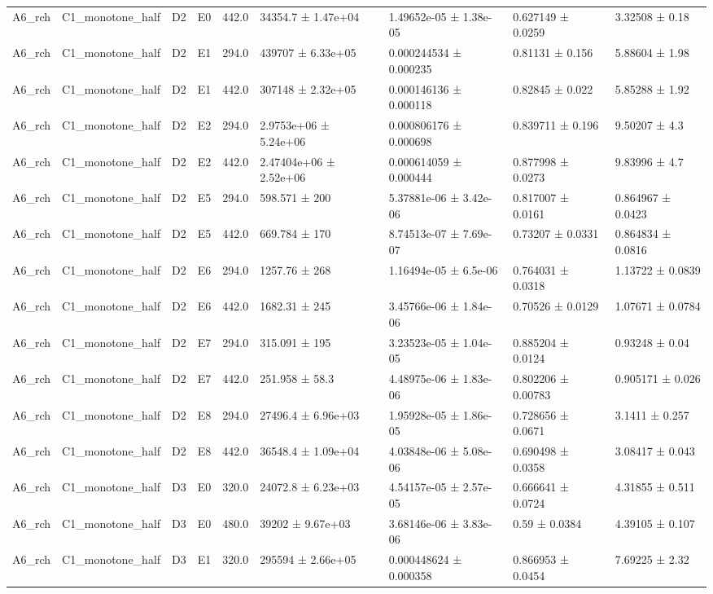 \begin{table}
\begin{tabular}{lllllllll}
A6\_rch & C1\_monotone\_half & D2 & E0 & 442.0 & 34354.7 ± 1.47e+04 & 1.49652e-05 ± 1.38e-05 & 0.627149 ± 0.0259 & 3.32508 ± 0.18 \\
A6\_rch & C1\_monotone\_half & D2 & E1 & 294.0 & 439707 ± 6.33e+05 & 0.000244534 ± 0.000235 & 0.81131 ± 0.156 & 5.88604 ± 1.98 \\
A6\_rch & C1\_monotone\_half & D2 & E1 & 442.0 & 307148 ± 2.32e+05 & 0.000146136 ± 0.000118 & 0.82845 ± 0.022 & 5.85288 ± 1.92 \\
A6\_rch & C1\_monotone\_half & D2 & E2 & 294.0 & 2.9753e+06 ± 5.24e+06 & 0.000806176 ± 0.000698 & 0.839711 ± 0.196 & 9.50207 ± 4.3 \\
A6\_rch & C1\_monotone\_half & D2 & E2 & 442.0 & 2.47404e+06 ± 2.52e+06 & 0.000614059 ± 0.000444 & 0.877998 ± 0.0273 & 9.83996 ± 4.7 \\
A6\_rch & C1\_monotone\_half & D2 & E5 & 294.0 & 598.571 ± 200 & 5.37881e-06 ± 3.42e-06 & 0.817007 ± 0.0161 & 0.864967 ± 0.0423 \\
A6\_rch & C1\_monotone\_half & D2 & E5 & 442.0 & 669.784 ± 170 & 8.74513e-07 ± 7.69e-07 & 0.73207 ± 0.0331 & 0.864834 ± 0.0816 \\
A6\_rch & C1\_monotone\_half & D2 & E6 & 294.0 & 1257.76 ± 268 & 1.16494e-05 ± 6.5e-06 & 0.764031 ± 0.0318 & 1.13722 ± 0.0839 \\
A6\_rch & C1\_monotone\_half & D2 & E6 & 442.0 & 1682.31 ± 245 & 3.45766e-06 ± 1.84e-06 & 0.70526 ± 0.0129 & 1.07671 ± 0.0784 \\
A6\_rch & C1\_monotone\_half & D2 & E7 & 294.0 & 315.091 ± 195 & 3.23523e-05 ± 1.04e-05 & 0.885204 ± 0.0124 & 0.93248 ± 0.04 \\
A6\_rch & C1\_monotone\_half & D2 & E7 & 442.0 & 251.958 ± 58.3 & 4.48975e-06 ± 1.83e-06 & 0.802206 ± 0.00783 & 0.905171 ± 0.026 \\
A6\_rch & C1\_monotone\_half & D2 & E8 & 294.0 & 27496.4 ± 6.96e+03 & 1.95928e-05 ± 1.86e-05 & 0.728656 ± 0.0671 & 3.1411 ± 0.257 \\
A6\_rch & C1\_monotone\_half & D2 & E8 & 442.0 & 36548.4 ± 1.09e+04 & 4.03848e-06 ± 5.08e-06 & 0.690498 ± 0.0358 & 3.08417 ± 0.043 \\
A6\_rch & C1\_monotone\_half & D3 & E0 & 320.0 & 24072.8 ± 6.23e+03 & 4.54157e-05 ± 2.57e-05 & 0.666641 ± 0.0724 & 4.31855 ± 0.511 \\
A6\_rch & C1\_monotone\_half & D3 & E0 & 480.0 & 39202 ± 9.67e+03 & 3.68146e-06 ± 3.83e-06 & 0.59 ± 0.0384 & 4.39105 ± 0.107 \\
A6\_rch & C1\_monotone\_half & D3 & E1 & 320.0 & 295594 ± 2.66e+05 & 0.000448624 ± 0.000358 & 0.866953 ± 0.0454 & 7.69225 ± 2.32 \\

\end{tabular}
\end{table}
